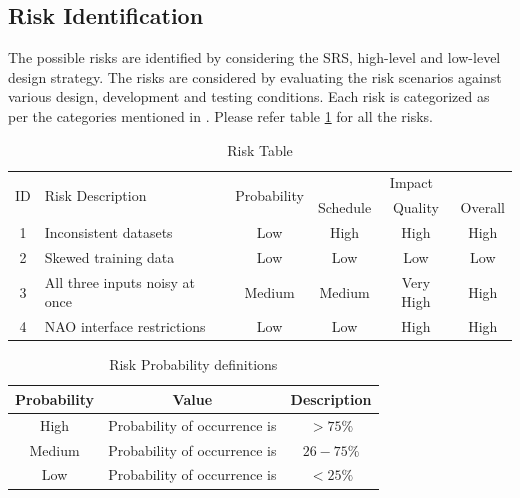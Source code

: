 \documentclass[oneside,a4paper,12pt]{report}
\begin{document}
\begin{normalsize}
\subsection{Risk Identification}
The possible risks are identified by considering the SRS, high-level and low-level design strategy. The risks are considered by evaluating the risk scenarios against various design, development and testing conditions. Each risk is categorized as per the categories mentioned in \cite{bookPressman}. Please refer table \ref{tab:risk} for all the risks.
\vspace{10mm}
\begin{table}[!htbp]
	\begin{center}
		\def\arraystretch{1.5}
		\begin{tabularx}{\textwidth}{| c | X | c | c | c | c |}
			\hline
			\multirow{2}{*}{ID} & \multirow{2}{*}{Risk Description}	& \multirow{2}{*}{Probability} & \multicolumn{3}{|c|}{Impact} \\ \cline{4-6}
			& & &	Schedule	& Quality	& Overall \\ \hline
			1	& Inconsistent datasets	& Low	& High	& High	& High \\ \hline
			2	& Skewed training data	& Low	& Low	& Low	& Low \\ \hline
			3	& All three inputs noisy at once	& Medium	& Medium	& Very High	& High \\ \hline
			4	& NAO interface restrictions	& Low	& Low	& High	& High \\ \hline
		\end{tabularx}
	\end{center}
	\caption{Risk Table}
	\label{tab:risk}
\end{table}


\begin{table}[!htbp]
	\begin{center}
		\def\arraystretch{1.5}
		\begin{tabular}{| c | c | c |}
			\hline
			Probability & Value &	Description \\ \hline
			High &	Probability of occurrence is &  $ > 75 \% $ \\ \hline
			Medium &	Probability of occurrence is  & $26-75 \% $ \\ \hline
			Low	& Probability of occurrence is & $ < 25 \% $ \\ \hline
		\end{tabular}
	\end{center}
	\caption{Risk Probability definitions}
	\label{tab:riskdef}
\end{table}


\end{normalsize}
\end{document}
